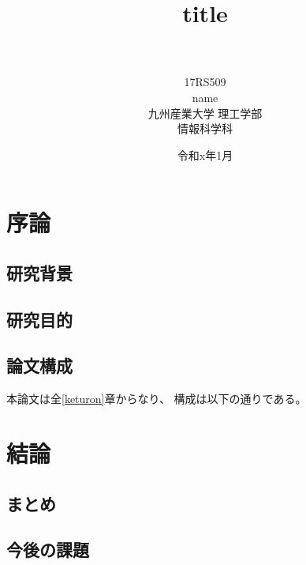 \documentclass[a4j,12pt,onecolumn,oneside,titlepage,openany,final]{jsreport}
\title{
 \Huge{title}\\
 \vspace{5.5cm}\\
}
\author{\LARGE{17RS509}\vspace{0.5cm}\\
\LARGE{name}\vspace{2cm}\\
\LARGE{九州産業大学 理工学部}\vspace{0.5cm}\\
\LARGE{情報科学科}\vspace{1cm}\\
}
\date{\LARGE{令和x年1月}}
\begin{document}
\maketitle
\tableofcontents
\listoffigures
\listoftables


\chapter{序論}\label{chap:joron}

\section{研究背景}\label{sec:haikei}
    
\section{研究目的}\label{sec:mokuteki}

\section{論文構成}\label{sec:kousei}

本論文は全\ref{keturon}章からなり、
構成は以下の通りである。


\chapter{}\label{chap:x}


\chapter{結論}\label{chap:keturon}

\section{まとめ}\label{sec:matome}
 
\section{今後の課題}\label{sec:kadai}
\end{document}
